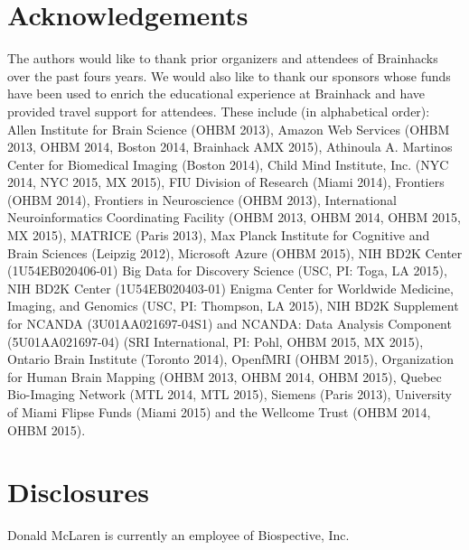 \documentclass[11pt]{bmc_article_s50}
\begin{document}
\section*{Acknowledgements}
The authors would like to thank prior organizers and attendees of Brainhacks over the past fours years. We would also like to thank our sponsors whose funds have been used to enrich the educational experience at Brainhack and have provided travel support for attendees. These include (in alphabetical order): Allen Institute for Brain Science (OHBM 2013), Amazon Web Services (OHBM 2013, OHBM 2014, Boston 2014, Brainhack AMX 2015), Athinoula A. Martinos Center for Biomedical Imaging (Boston 2014), Child Mind Institute, Inc. (NYC 2014, NYC 2015, MX 2015), FIU Division of Research (Miami 2014), Frontiers (OHBM 2014), Frontiers in Neuroscience (OHBM 2013), International Neuroinformatics Coordinating Facility (OHBM 2013, OHBM 2014, OHBM 2015, MX 2015), MATRICE (Paris 2013), Max Planck Institute for Cognitive and Brain Sciences (Leipzig 2012), Microsoft Azure (OHBM 2015), NIH BD2K Center (1U54EB020406-01) Big Data for Discovery Science (USC, PI: Toga, LA 2015), NIH BD2K Center (1U54EB020403-01) Enigma Center for Worldwide Medicine, Imaging, and Genomics (USC, PI: Thompson, LA 2015), NIH BD2K Supplement for NCANDA (3U01AA021697-04S1) and NCANDA: Data Analysis Component (5U01AA021697-04) (SRI International, PI: Pohl, OHBM 2015, MX 2015), Ontario Brain Institute (Toronto 2014), OpenfMRI (OHBM 2015), Organization for Human Brain Mapping (OHBM 2013, OHBM 2014, OHBM 2015), Quebec Bio-Imaging Network (MTL 2014, MTL 2015), Siemens (Paris 2013), University of Miami Flipse Funds (Miami 2015) and the Wellcome Trust (OHBM 2014, OHBM 2015).

\section*{Disclosures}

Donald McLaren is currently an employee of Biospective, Inc.






 
 
\end{document}
